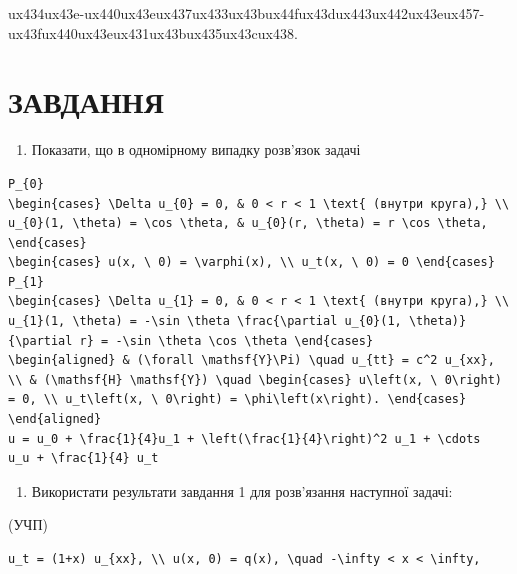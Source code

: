 \documentclass[
  ukrainian,
]{article}
\providecommand{\tightlist}{%
  \setlength{\itemsep}{0pt}\setlength{\parskip}{0pt}}
\begin{document}
{ux434ux43e-ux440ux43eux437ux433ux43bux44fux43dux443ux442ux43eux457-ux43fux440ux43eux431ux43bux435ux43cux438.}

\section{ЗАВДАННЯ}\label{ux437ux430ux432ux434ux430ux43dux43dux44f-1}

\begin{enumerate}
\def\labelenumi{\arabic{enumi}.}
\tightlist
\item
  Показати, що в одномірному випадку розв'язок задачі
\end{enumerate}

\begin{verbatim}
P_{0}
\begin{cases} \Delta u_{0} = 0, & 0 < r < 1 \text{ (внутри круга),} \\ u_{0}(1, \theta) = \cos \theta, & u_{0}(r, \theta) = r \cos \theta, \end{cases}
\begin{cases} u(x, \ 0) = \varphi(x), \\ u_t(x, \ 0) = 0 \end{cases}
P_{1}
\begin{cases} \Delta u_{1} = 0, & 0 < r < 1 \text{ (внутри круга),} \\ u_{1}(1, \theta) = -\sin \theta \frac{\partial u_{0}(1, \theta)}{\partial r} = -\sin \theta \cos \theta \end{cases}
\begin{aligned} & (\forall \mathsf{Y}\Pi) \quad u_{tt} = c^2 u_{xx}, \\ & (\mathsf{H} \mathsf{Y}) \quad \begin{cases} u\left(x, \ 0\right) = 0, \\ u_t\left(x, \ 0\right) = \phi\left(x\right). \end{cases} \end{aligned}
u = u_0 + \frac{1}{4}u_1 + \left(\frac{1}{4}\right)^2 u_1 + \cdots
u_u + \frac{1}{4} u_t
\end{verbatim}

\begin{enumerate}
\def\labelenumi{\arabic{enumi}.}
\setcounter{enumi}{1}
\tightlist
\item
  Використати результати завдання 1 для розв'язання наступної задачі:
\end{enumerate}

(УЧП)

\begin{verbatim}
u_t = (1+x) u_{xx}, \\ u(x, 0) = q(x), \quad -\infty < x < \infty,
\end{verbatim}
\end{document}
